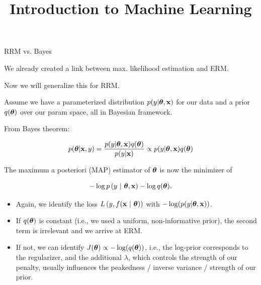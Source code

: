 \documentclass[11pt,compress,t,notes=noshow, xcolor=table]{beamer}
\title{Introduction to Machine Learning}
\begin{document}




\begin{vbframe} {RRM vs. Bayes}

We already created a link between max. likelihood estimation and ERM.

\lz 

Now we will generalize this for RRM.

\lz

Assume we have a parameterized distribution $p(y | \bm{\theta}, \mathbf{x})$ for our data and 
a prior $q(\bm{\theta})$ over our param space, all in Bayesian framework.

\lz \lz

From Bayes theorem:

$$
p(\bm{\theta} | \mathbf{x}, y) = \frac{p(y | \bm{\theta}, \mathbf{x}) q(\bm{\theta}) }{p(y | \mathbf{x})} \propto 
p(y | \bm{\theta}, \mathbf{x}) q(\bm{\theta})
$$

\framebreak

The maximum a posteriori (MAP) estimator of $\bm{\theta}$ is now the minimizer of

$$
- \log p\left(y ~|~ \bm{\theta}, \mathbf{x}\right) - \log q(\bm{\theta}).
$$

\begin{itemize}
  \item Again, we identify the loss $L\left(y, f(\mathbf{x} ~|~ \bm{\theta})\right)$ with $-\log(p(y | \bm{\theta}, \mathbf{x}))$.
  \item If $q(\bm{\theta})$ is constant (i.e., we used a uniform, non-informative 
  prior), the second term is irrelevant and we arrive at ERM.
  \item If not, we can identify $J(\bm{\theta}) \propto -\log(q(\bm{\theta}))$, i.e., 
  the log-prior corresponds to the regularizer, and the additional $\lambda$, which controls the strength of our
  penalty, usually influences the peakedness / inverse variance / strength of our prior.
\end{itemize}


\end{vbframe}
\end{document}

